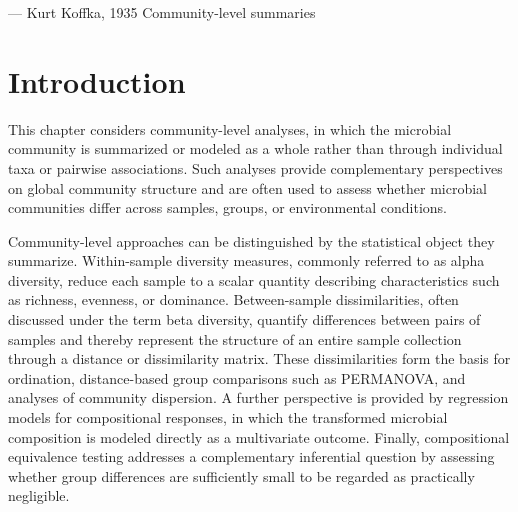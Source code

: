 
  {--- Kurt Koffka, 1935}
  {Community-level summaries}
\nocite{koffka1935principles}
\chaptercontents

\section{Introduction}
\label{sec:3community:intro}

This chapter considers community-level analyses, in which the microbial community is summarized or modeled as a whole rather than through individual taxa or pairwise associations. Such analyses provide complementary perspectives on global community structure and are often used to assess whether microbial communities differ across samples, groups, or environmental conditions.

Community-level approaches can be distinguished by the statistical object they summarize. Within-sample diversity measures, commonly referred to as alpha diversity, reduce each sample to a scalar quantity describing characteristics such as richness, evenness, or dominance. Between-sample dissimilarities, often discussed under the term beta diversity, quantify differences between pairs of samples and thereby represent the structure of an entire sample collection through a distance or dissimilarity matrix. These dissimilarities form the basis for ordination, distance-based group comparisons such as PERMANOVA, and analyses of community dispersion. A further perspective is provided by regression models for compositional responses, in which the transformed microbial composition is modeled directly as a multivariate outcome. Finally, compositional equivalence testing addresses a complementary inferential question by assessing whether group differences are sufficiently small to be regarded as practically negligible.

